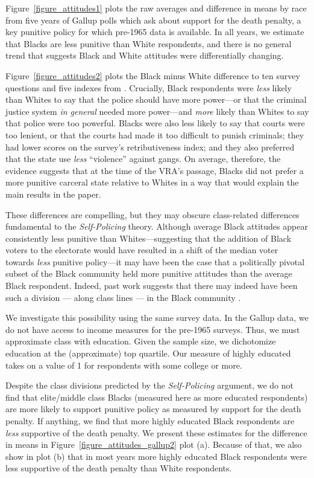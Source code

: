 \documentclass[12pt]{article}
\begin{document}
Figure~\ref{figure_attitudes1} plots the raw averages and difference in means by race from five years of Gallup polls which ask about support for the death penalty, a key punitive policy for which pre-1965 data is available.  In all years, we estimate that Blacks are less punitive than White respondents, and there is no general trend that suggests Black and White attitudes were differentially changing.

Figure~\ref{figure_attitudes2} plots the Black minus White difference to ten survey questions and five indexes from \cite{Violence1969}.  Crucially, Black respondents were \emph{less} likely than Whites to say that the police should have more power---or that the criminal justice system \emph{in general} needed more power---and \emph{more} likely than Whites to say that police were too powerful.  Blacks were also less likely to say that courts were too lenient, or that the courts had made it too difficult to punish criminals; they had lower scores on the survey's retributiveness index; and they also preferred that the state use \emph{less} ``violence'' against gangs.  On average, therefore, the evidence suggests that at the time of the VRA's passage, Blacks did not prefer a more punitive carceral state relative to Whites in a way that would explain the main results in the paper.

These differences are compelling, but they may obscure class-related differences fundamental to the \emph{Self-Policing} theory.  Although average Black attitudes appear consistently less punitive than Whites---suggesting that the addition of Black voters to the electorate would have resulted in a shift of the median voter towards \emph{less} punitive policy---it may have been the case that a politically pivotal subset of the Black community held more punitive attitudes than the average Black respondent.  Indeed, past work suggests that there may indeed have been such a division --- along class lines --- in the Black community \citep{Fortner:2015uz,FormanJr:2017tz,Clegg:2018uq}.

We investigate this possibility using the same survey data.  In the Gallup data, we do not have access to income measures for the pre-1965 surveys.  Thus, we must approximate class with education.  Given the sample size, we dichotomize education at the (approximate) top quartile.  Our measure of highly educated takes on a value of 1 for respondents with some college or more.

Despite the class divisions predicted by the \emph{Self-Policing} argument, we do not find that elite/middle class Blacks (measured here as more educated respondents) are more likely to support punitive policy as measured by support for the death penalty.  If anything, we find that more highly educated Black respondents are \emph{less} supportive of the death penalty.  We present these estimates for the difference in means in Figure~\ref{figure_attitudes_gallup2} plot (a).  Because of that, we also show in plot (b) that in most years more highly educated Black respondents were less supportive of the death penalty than White respondents.
\end{document}
